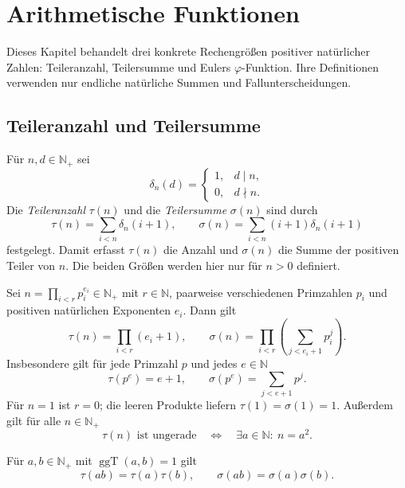 \chapter{Arithmetische Funktionen}
\label{b10guide:ch:arithmetic-functions}

Dieses Kapitel behandelt drei konkrete Rechengrößen positiver
natürlicher Zahlen: Teileranzahl, Teilersumme und Eulers
$\varphi$-Funktion. Ihre Definitionen verwenden nur endliche
natürliche Summen und Fallunterscheidungen.

\section{Teileranzahl und Teilersumme}

\begin{definition}
\label{b10guide:def:divisor-functions}
Für $n,d\in\mathbb N_+$ sei
\[
 \delta_n(d)=
 \begin{cases}
  1,&d\mid n,\\
  0,&d\nmid n.
 \end{cases}
\]
Die \emph{Teileranzahl} $\tau(n)$ und die \emph{Teilersumme}
$\sigma(n)$ sind durch
\[
 \tau(n)=\sum_{i<n}\delta_n(i+1),\qquad
 \sigma(n)=\sum_{i<n}(i+1)\delta_n(i+1)
\]
festgelegt. Damit erfasst $\tau(n)$ die Anzahl und $\sigma(n)$
die Summe der positiven Teiler von $n$.
Die beiden Größen werden hier nur für $n>0$ definiert.
\end{definition}

\begin{theorem}
\label{b10guide:thm:divisor-product-formulas}
Sei $n=\prod_{i<r}p_i^{e_i}\in\mathbb N_+$ mit $r\in\mathbb N$,
paarweise verschiedenen Primzahlen $p_i$ und positiven natürlichen
Exponenten $e_i$. Dann gilt \cite{natarithfunctions}
\[
 \tau(n)=\prod_{i<r}(e_i+1),\qquad
 \sigma(n)=\prod_{i<r}\left(\sum_{j<e_i+1}p_i^j\right).
\]
Insbesondere gilt für jede Primzahl $p$ und jedes $e\in\mathbb N$
\[
 \tau(p^e)=e+1,\qquad
 \sigma(p^e)=\sum_{j<e+1}p^j.
\]
Für $n=1$ ist $r=0$; die leeren Produkte liefern
$\tau(1)=\sigma(1)=1$. Außerdem gilt für alle $n\in\mathbb N_+$
\[
 \tau(n)\text{ ist ungerade}
 \quad\Longleftrightarrow\quad
 \exists a\in\mathbb N:\ n=a^2.
\]
\end{theorem}

\begin{theorem}
\label{b10guide:thm:divisor-functions-coprime-product}
Für $a,b\in\mathbb N_+$ mit $\operatorname{ggT}(a,b)=1$ gilt
\cite{natarithfunctions}
\[
 \tau(ab)=\tau(a)\tau(b),\qquad
 \sigma(ab)=\sigma(a)\sigma(b).
\]
\end{theorem}

